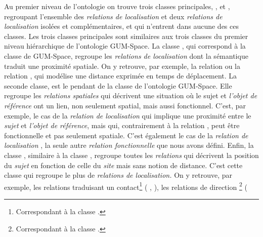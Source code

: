 Au premier niveau de l'ontologie on trouve trois classes principales,
,
 et
,
regroupant l'ensemble des \emph{relations de localisation} et deux
\emph{relations de localisation} isolées et complémentaires,
 et 
qui n'entrent dans aucune des ces classes. Les trois classes
principales sont similaires aux trois classes du premier niveau
hiérarchique de l'ontologie GUM-Space. La classe
, qui
correspond à la classe
 de GUM-Space,
regroupe les \emph{relations de localisation} dont la sémantique
traduit une proximité spatiale. On y retrouve, par exemple, la
relation  ou la relation
, qui modélise une distance exprimée
en temps de déplacement. La seconde classe,
 est le
pendant de la classe
 de
l'ontologie GUM-Space. Elle regroupe les \emph{relations spatiales}
qui décrivent une situation où le sujet et \emph{l'objet de référence}
ont un lien, non seulement spatial, mais aussi fonctionnel. C'est, par
exemple, le cas de la \emph{relation de localisation}
 qui implique une proximité entre le
\emph{sujet} et \emph{l'objet de référence}, mais qui, contrairement à
la relation , peut être fonctionnelle et pas
seulement spatiale. C'est également le cas de la \emph{relation de
  localisation}
,
la seule autre \emph{relation fonctionnelle} que nous avons défini.
Enfin, la classe
,
similaire à la classe
, regroupe
toutes les \emph{relations} qui décrivent la position du \emph{sujet}
en fonction de celle du \emph{site} mais sans notion de
distance. C'est cette classe qui regroupe le plus de \emph{relations
  de localisation.} On y retrouve, par exemple, les relations
traduisant un contact\footnote{Correspondant à la classe
  .} (\eg
{},
), les relations de direction
\footnote{Correspondant à la classe
  .} (\eg
